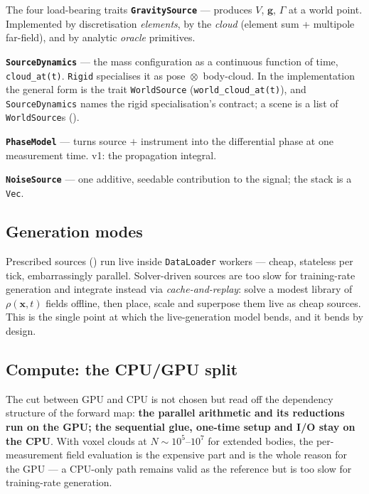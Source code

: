 \documentclass[11pt,a4paper]{article}
\theoremstyle{reqstyle}
\newcommand{\xv}{\mathbf{x}}
\begin{document}
\begin{seambox}{The four load-bearing traits}
\textbf{\texttt{GravitySource}} --- produces $V$, $\mathbf g$, $\Gamma$ at a world point.
Implemented by discretisation \emph{elements}, by the \emph{cloud} (element sum +
multipole far-field), and by analytic \emph{oracle} primitives.

\textbf{\texttt{SourceDynamics}} --- the mass configuration as a continuous function of
time, \texttt{cloud\_at(t)}. \texttt{Rigid} specialises it as pose~$\otimes$~body-cloud. In
the implementation the general form is the trait \texttt{WorldSource}
(\texttt{world\_cloud\_at(t)}), and \texttt{SourceDynamics} names the rigid specialisation's
contract; a scene is a list of \texttt{WorldSource}s ().

\textbf{\texttt{PhaseModel}} --- turns source $+$ instrument into the differential phase at
one measurement time. v1: the propagation integral.

\textbf{\texttt{NoiseSource}} --- one additive, seedable contribution to the signal; the
stack is a \texttt{Vec}.
\end{seambox}

\subsection{Generation modes}
Prescribed sources () run live inside \texttt{DataLoader} workers ---
cheap, stateless per tick, embarrassingly parallel. Solver-driven sources are too slow for
training-rate generation and integrate instead via \emph{cache-and-replay}: solve a modest
library of $\rho(\xv,t)$ fields offline, then place, scale and superpose them live as cheap
sources. This is the single point at which the live-generation model bends, and it bends by
design.

\subsection{Compute: the CPU/GPU split}
\label{sec:compute}
The cut between GPU and CPU is not chosen but read off the dependency structure of the
forward map: \textbf{the parallel arithmetic and its reductions run on the GPU; the
sequential glue, one-time setup and I/O stay on the CPU}. With voxel clouds at
$N\sim 10^5$--$10^7$ for extended bodies, the per-measurement field evaluation is the
expensive part and is the whole reason for the GPU --- a CPU-only path remains valid as the
reference but is too slow for training-rate generation.
\end{document}
